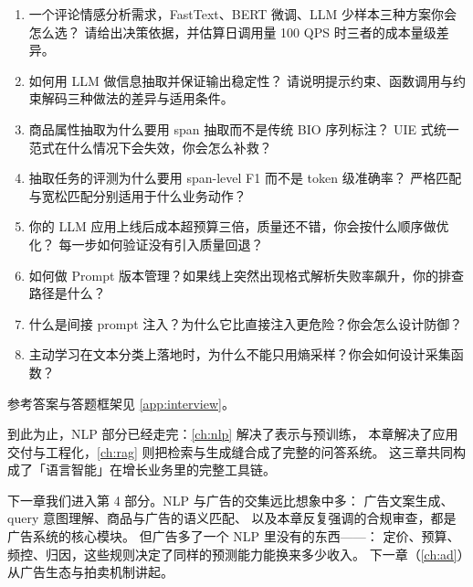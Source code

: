 \begin{interview}[本章对应的面试题]
\begin{enumerate}
  \item 一个评论情感分析需求，FastText、BERT 微调、LLM 少样本三种方案你会怎么选？
        请给出决策依据，并估算日调用量 100 QPS 时三者的成本量级差异。
  \item 如何用 LLM 做信息抽取并保证输出稳定性？
        请说明提示约束、函数调用与约束解码三种做法的差异与适用条件。
  \item 商品属性抽取为什么要用 span 抽取而不是传统 BIO 序列标注？
        UIE 式统一范式在什么情况下会失效，你会怎么补救？
  \item 抽取任务的评测为什么要用 span-level F1 而不是 token 级准确率？
        严格匹配与宽松匹配分别适用于什么业务动作？
  \item 你的 LLM 应用上线后成本超预算三倍，质量还不错，你会按什么顺序做优化？
        每一步如何验证没有引入质量回退？
  \item 如何做 Prompt 版本管理？如果线上突然出现格式解析失败率飙升，你的排查路径是什么？
  \item 什么是间接 prompt 注入？为什么它比直接注入更危险？你会怎么设计防御？
  \item 主动学习在文本分类上落地时，为什么不能只用熵采样？你会如何设计采集函数？
\end{enumerate}
参考答案与答题框架见 \cref{app:interview}。
\end{interview}

到此为止，NLP 部分已经走完：\cref{ch:nlp} 解决了表示与预训练，
本章解决了应用交付与工程化，\cref{ch:rag} 则把检索与生成缝合成了完整的问答系统。
这三章共同构成了「语言智能」在增长业务里的完整工具链。

下一章我们进入第 4 部分。NLP 与广告的交集远比想象中多：
广告文案生成、query 意图理解、商品与广告的语义匹配、
以及本章反复强调的合规审查，都是广告系统的核心模块。
但广告多了一个 NLP 里没有的东西——：
定价、预算、频控、归因，这些规则决定了同样的预测能力能换来多少收入。
下一章（\cref{ch:ad}）从广告生态与拍卖机制讲起。
